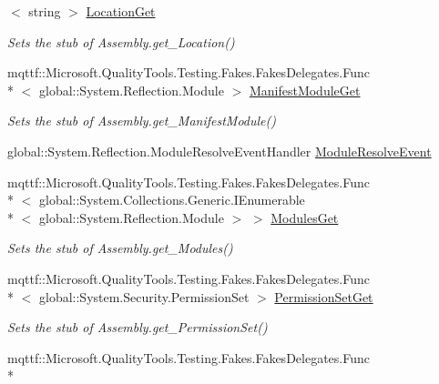 \begin{DoxyCompactItemize}
$<$ string $>$ \hyperlink{class_system_1_1_reflection_1_1_fakes_1_1_stub_assembly_aa3fddaee8f05a153671bc0e67a9ac5f0}{Location\-Get}
\begin{DoxyCompactList}\small\item\em Sets the stub of Assembly.\-get\-\_\-\-Location()\end{DoxyCompactList}\item 
mqttf\-::\-Microsoft.\-Quality\-Tools.\-Testing.\-Fakes.\-Fakes\-Delegates.\-Func\\*
$<$ global\-::\-System.\-Reflection.\-Module $>$ \hyperlink{class_system_1_1_reflection_1_1_fakes_1_1_stub_assembly_a721f5f3123f0a49d3e080d72f8f5f50e}{Manifest\-Module\-Get}
\begin{DoxyCompactList}\small\item\em Sets the stub of Assembly.\-get\-\_\-\-Manifest\-Module()\end{DoxyCompactList}\item 
global\-::\-System.\-Reflection.\-Module\-Resolve\-Event\-Handler \hyperlink{class_system_1_1_reflection_1_1_fakes_1_1_stub_assembly_aa6bc2b3b802ba7df2df6867471eff813}{Module\-Resolve\-Event}
\item 
mqttf\-::\-Microsoft.\-Quality\-Tools.\-Testing.\-Fakes.\-Fakes\-Delegates.\-Func\\*
$<$ global\-::\-System.\-Collections.\-Generic.\-I\-Enumerable\\*
$<$ global\-::\-System.\-Reflection.\-Module $>$ $>$ \hyperlink{class_system_1_1_reflection_1_1_fakes_1_1_stub_assembly_ab319326c51e76e814bf1dd894a84eadb}{Modules\-Get}
\begin{DoxyCompactList}\small\item\em Sets the stub of Assembly.\-get\-\_\-\-Modules()\end{DoxyCompactList}\item 
mqttf\-::\-Microsoft.\-Quality\-Tools.\-Testing.\-Fakes.\-Fakes\-Delegates.\-Func\\*
$<$ global\-::\-System.\-Security.\-Permission\-Set $>$ \hyperlink{class_system_1_1_reflection_1_1_fakes_1_1_stub_assembly_ab26b60412936973a9eebee4af23e0619}{Permission\-Set\-Get}
\begin{DoxyCompactList}\small\item\em Sets the stub of Assembly.\-get\-\_\-\-Permission\-Set()\end{DoxyCompactList}\item 
mqttf\-::\-Microsoft.\-Quality\-Tools.\-Testing.\-Fakes.\-Fakes\-Delegates.\-Func\\*

\end{DoxyCompactItemize}
